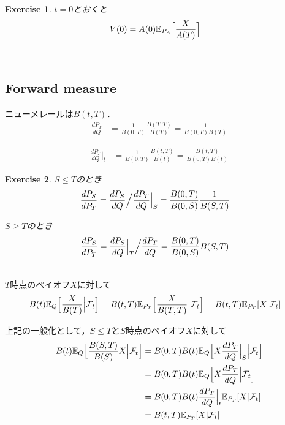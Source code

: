 \documentclass[11pt, a4paper]{jsarticle}
\newcommand{\E}{\mathbb{E}}
\newtheorem{exercise}{Exercise}[section]
\begin{document}
\hrulefill
\begin{exercise}
$t=0$とおくと
\begin{align}
V(0)
& =
A(0) \E_{P_A} \Bigl[ \frac{X}{A(T)} \Bigr] \nonumber
\end{align}
\end{exercise}
\hrulefill \\

\subsection{Forward measure}
ニューメレールは$B(t, T)$．
\begin{align}
\frac{d P_T}{d Q}
& =
\frac{1}{B(0, T)} \frac{B(T, T)}{B(T)}
= \frac{1}{B(0, T) B(T)} \nonumber
\end{align}

\begin{align}
\frac{d P_T}{d Q} \Bigr|_t
& =
\frac{1}{B(0, T)} \frac{B(t, T)}{B(t)}
= \frac{B(t, T)}{B(0, T) B(t)} \nonumber
\end{align}

\hrulefill
\begin{exercise}
$S \leq T$のとき
\begin{align}
\frac{dP_S}{dP_T}
& =
\frac{dP_S}{dQ} \Bigl/ \frac{dP_T}{dQ} \Bigr|_S
= \frac{B(0, T)}{B(0, S)} \frac{1}{B(S, T)} \nonumber
\end{align}

$S \geq T$のとき
\begin{align}
\frac{dP_S}{dP_T}
& =
\frac{dP_S}{dQ} \Bigr|_T \Bigl/ \frac{dP_T}{dQ}
= \frac{B(0, T)}{B(0, S)} B(S, T) \nonumber
\end{align}
\end{exercise}
\hrulefill \\

$T$時点のペイオフ$X$に対して
\begin{align}
B(t) \E_Q \Bigl[ \frac{X}{B(T)} \Bigl| \mathcal{F}_t \Bigr]
& =
B(t, T) \E_{P_T} \Bigl[ \frac{X}{B(T, T)} \Bigl| \mathcal{F}_t \Bigr]
= B(t, T) \E_{P_T} [ X | \mathcal{F}_t ] \nonumber
\nonumber
\end{align}

上記の一般化として，$S \leq T$と$S$時点のペイオフ$X$に対して
\begin{align}
B(t) \E_Q \Bigl[ \frac{B(S, T)}{B(S)} X \Bigl| \mathcal{F}_t \Bigr]
& =
B(0, T) B(t) \E_Q \Bigl[ X \frac{d P_T}{d Q} \Bigr|_S \Bigl| \mathcal{F}_t \Bigr] \nonumber \\
& =
B(0, T) B(t) \E_Q \Bigl[ X \frac{d P_T}{d Q} \Bigl| \mathcal{F}_t \Bigr] \nonumber \\
& =
B(0, T) B(t) \frac{d P_T}{d Q} \Bigr|_t \E_{P_T} [ X | \mathcal{F}_t ] \nonumber \\
& =
B(t, T) \E_{P_T} [ X | \mathcal{F}_t ] \nonumber
\nonumber
\end{align}
\end{document}
